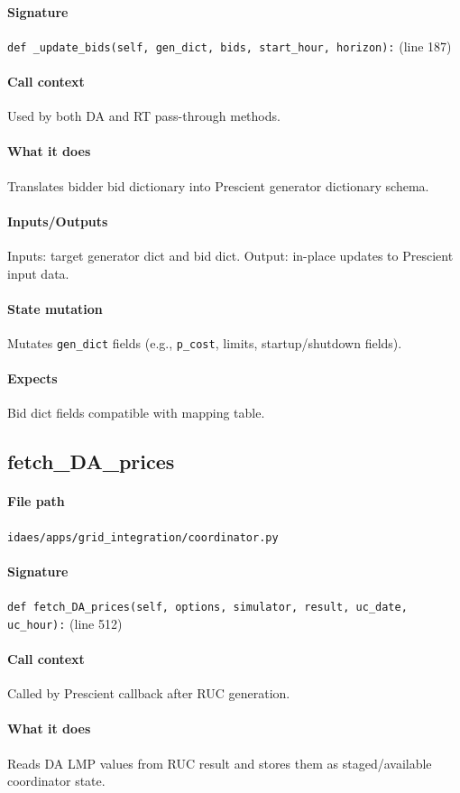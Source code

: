 \documentclass{article}
\begin{document}
\paragraph{Signature} \texttt{def \_update\_bids(self, gen\_dict, bids, start\_hour, horizon):} (line 187)
\paragraph{Call context} Used by both DA and RT pass-through methods.
\paragraph{What it does} Translates bidder bid dictionary into Prescient generator dictionary schema.
\paragraph{Inputs/Outputs} Inputs: target generator dict and bid dict. Output: in-place updates to Prescient input data.
\paragraph{State mutation} Mutates \texttt{gen\_dict} fields (e.g., \texttt{p\_cost}, limits, startup/shutdown fields).
\paragraph{Expects} Bid dict fields compatible with mapping table.

\subsection{fetch\_DA\_prices}\label{fn:fetch_DA_prices}
\paragraph{File path} \texttt{idaes/apps/grid\_integration/coordinator.py}
\paragraph{Signature} \texttt{def fetch\_DA\_prices(self, options, simulator, result, uc\_date, uc\_hour):} (line 512)
\paragraph{Call context} Called by Prescient callback after RUC generation.
\paragraph{What it does} Reads DA LMP values from RUC result and stores them as staged/available coordinator state.
\end{document}
